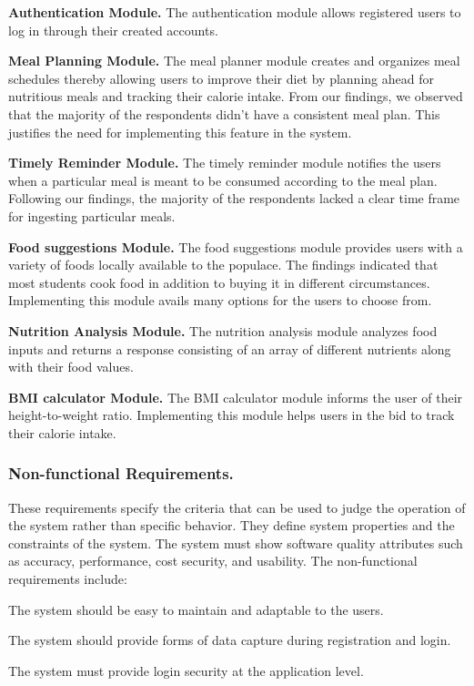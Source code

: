 \documentclass{article}
\begin{document}
\noindent
\textbf{Authentication Module.} The authentication module allows registered users to log in through their created accounts. 

\noindent
\textbf{Meal Planning Module.} The meal planner module creates and organizes meal schedules thereby allowing users to improve their diet by planning ahead for nutritious meals and tracking their calorie intake. From our findings, we observed that the majority of the respondents didn’t have a consistent meal plan. This justifies the need for implementing this feature in the system.

\noindent
\textbf{Timely Reminder Module.} The timely reminder module notifies the users when a particular meal is meant to be consumed according to the meal plan. Following our findings, the majority of the respondents lacked a clear time frame for ingesting particular meals.

\noindent
\textbf{Food suggestions Module.} The food suggestions module provides users with a variety of foods locally available to the populace. The findings indicated that most students cook food in addition to buying it in different circumstances. Implementing this module avails many options for the users to choose from.

\noindent
\textbf{Nutrition Analysis Module.} The nutrition analysis module analyzes food inputs and returns a response consisting of an array of different nutrients along with their food values.

\noindent
\textbf{BMI calculator Module.} The BMI calculator module informs the user of their height-to-weight ratio. Implementing this module helps users in the bid to track their calorie intake.

\subsubsection{Non-functional Requirements.}
These requirements specify the criteria that can be used to judge the operation of the system rather than specific behavior. They define system properties and the constraints of the system. The system must show software quality attributes such as accuracy, performance, cost security, and usability. The non-functional requirements include:

The system should be easy to maintain and adaptable to the users.

The system should provide forms of data capture during registration and login.

The system must provide login security at the application level.
\end{document}
